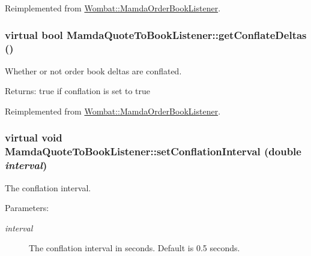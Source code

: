 Reimplemented from \hyperlink{classWombat_1_1MamdaOrderBookListener_0b19000efe1f7135813b810dbe2e78ff}{Wombat::Mamda\-Order\-Book\-Listener}.\hypertarget{classMamdaQuoteToBookListener_424049fa1fff7fe0a6e7da84ea9b2da6}{
\subsubsection[getConflateDeltas]{\setlength{\rightskip}{0pt plus 5cm}virtual bool Mamda\-Quote\-To\-Book\-Listener::get\-Conflate\-Deltas ()}}
\label{classMamdaQuoteToBookListener_424049fa1fff7fe0a6e7da84ea9b2da6}


Whether or not order book deltas are conflated. 

\begin{Desc}
\item[Returns:]true if conflation is set to true \end{Desc}


Reimplemented from \hyperlink{classWombat_1_1MamdaOrderBookListener_2f72b21861b1f4a0462624eaa236a298}{Wombat::Mamda\-Order\-Book\-Listener}.\hypertarget{classMamdaQuoteToBookListener_f821050ad069bc72b07f419c441e85cc}{
\subsubsection[setConflationInterval]{\setlength{\rightskip}{0pt plus 5cm}virtual void Mamda\-Quote\-To\-Book\-Listener::set\-Conflation\-Interval (double {\em interval})}}
\label{classMamdaQuoteToBookListener_f821050ad069bc72b07f419c441e85cc}


The conflation interval. 

\begin{Desc}
\item[Parameters:]
\begin{description}
\item[{\em interval}]The conflation interval in seconds. Default is 0.5 seconds. \end{description}
\end{Desc}


